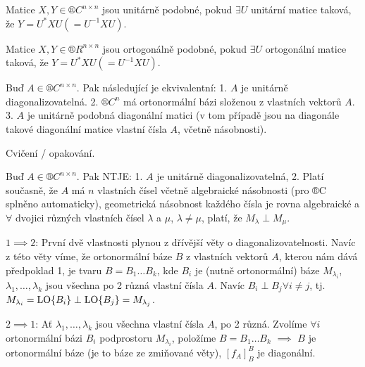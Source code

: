 \documentclass[12pt]{article}                   %
\begin{document}
    \begin{definice}
        Matice $X, Y \in ®C^{n \times n}$ jsou unitárně podobné, pokud $\exists U$ unitární matice taková, že $Y = U^*XU (= U^{-1}XU)$.
    \end{definice}

    \begin{definice}
        Matice $X, Y \in ®R^{n \times n}$ jsou ortogonálně podobné, pokud $\exists U$ ortogonální matice taková, že $Y = U^*XU (= U^{-1}XU)$.
    \end{definice}

    \begin{tvrzeni}
        Buď $A \in ®C^{n \times n}$. Pak následující je ekvivalentní: 1. $A$ je unitárně diagonalizovatelná. 2. $®C^n$ má ortonormální bázi složenou z vlastních vektorů $A$. 3. $A$ je unitárně podobná diagonální matici (v tom případě jsou na diagonále takové diagonální matice vlastní čísla $A$, včetně násobnosti).

        \begin{dukazin}
            Cvičení / opakování.
        \end{dukazin}
    \end{tvrzeni}

    \begin{veta}
        Buď $A \in ®C^{n \times n}$. Pak NTJE: 1. $A$ je unitárně diagonalizovatelná, 2. Platí současně, že $A$ má $n$ vlastních čísel včetně algebraické násobnosti (pro ®C splněno automaticky), geometrická násobnost každého čísla je rovna algebraické a $\forall$ dvojici různých vlastních čísel $\lambda$ a $\mu$, $\lambda ≠ \mu$, platí, že $M_\lambda \perp M_\mu$.

        \begin{dukazin}
            $1 \implies 2$: První dvě vlastnosti plynou z dřívější věty o diagonalizovatelnosti. Navíc z této věty víme, že ortonormální báze $B$ z vlastních vektorů $A$, kterou nám dává předpoklad 1, je tvaru $B = B_1…B_k$, kde $B_i$ je (nutně ortonormální) báze $M_{\lambda_i}$, $\lambda_1, …, \lambda_k$ jsou všechna po 2 různá vlastní čísla $A$. Navíc $B_i \perp B_j \forall i ≠ j$, tj. $M_{\lambda_i} = \operatorname{LO}\{B_i\} \perp \operatorname{LO}\{B_j\} = M_{\lambda_j}$.

            $2 \implies 1$: Ať $\lambda_1, …, \lambda_k$ jsou všechna vlastní čísla $A$, po 2 různá. Zvolíme $\forall i$ ortonormální bázi $B_i$ podprostoru $M_{\lambda_i}$, položíme $B = B_1…B_k$ $\implies$ $B$ je ortonormální báze (je to báze ze zmiňované věty), $[f_A]_B^B$ je diagonální.
        \end{dukazin}
    \end{veta}
\end{document}
